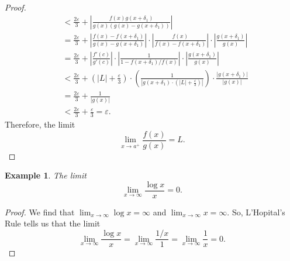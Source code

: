 \documentclass[a4paper, openany]{memoir}
\theoremstyle{definition}
\theoremstyle{plain}
\newtheorem{example}[definition]{Example}
\begin{document}
\begin{proof}
\begin{align*}
    &< \frac{2\varepsilon}{3} + \left|\frac{f(x) g(x + \delta_1)}{g(x) (g(x) - g(x+\delta_1))}\right| \\
    &= \frac{2\varepsilon}{3} + \left|\frac{f(x) - f(x+\delta_1)}{g(x) - g(x+\delta_1)}\right| \cdot \left|\frac{f(x)}{f(x) - f(x + \delta_1)}\right| \cdot \left|\frac{g(x+\delta_1)}{g(x)}\right| \\
    &= \frac{2\varepsilon}{3} + \left|\frac{f'(c)}{g'(c)}\right| \cdot \left|\frac{1}{1 - f(x + \delta_1)/f(x)}\right| \cdot \left|\frac{g(x+\delta_1)}{g(x)}\right| \\
    &< \frac{2\varepsilon}{3} + \left(|L| + \frac{\varepsilon}{3}\right) \cdot \left(\frac{1}{|g(x + \delta_1) \cdot (|L| + \frac{\varepsilon}{3})|}\right) \cdot \frac{|g(x + \delta_1)|}{|g(x)|} \\
    &= \frac{2\varepsilon}{3} + \frac{1}{|g(x)|} \\
    &< \frac{2\varepsilon}{3} + \frac{\varepsilon}{3} = \varepsilon.
\end{align*}
Therefore, the limit
\[\lim_{x \to a^+} \frac{f(x)}{g(x)} = L.\]
\end{proof}

\begin{example}
The limit
\[\lim_{x \to \infty} \frac{\log x}{x} = 0.\]
\end{example}
\begin{proof}
We find that $\lim_{x \to \infty} \log x = \infty$ and $\lim_{x \to \infty} x = \infty$. So, L'Hopital's Rule tells us that the limit
\[\lim_{x \to \infty} \frac{\log x}{x} = \lim_{x \to \infty} \frac{1/x}{1} = \lim_{x \to \infty} \frac{1}{x} = 0.\]
\end{proof}

\newpage
\end{document}
